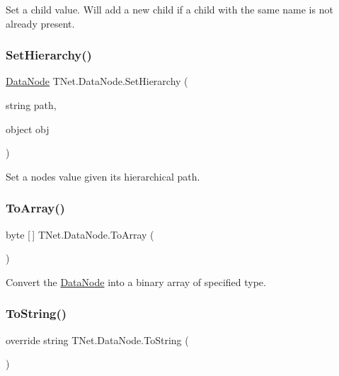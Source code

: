 Set a child value. Will add a new child if a child with the same name is not already present. 

\mbox{\label{class_t_net_1_1_data_node_a2bc2cd72d6ab059e99cb792a5c21ee13}} 
\subsubsection{\texorpdfstring{Set\+Hierarchy()}{SetHierarchy()}}
{\footnotesize\ttfamily \mbox{\hyperlink{class_t_net_1_1_data_node}{Data\+Node}} T\+Net.\+Data\+Node.\+Set\+Hierarchy (\begin{DoxyParamCaption}\item[{string}]{path,  }\item[{object}]{obj }\end{DoxyParamCaption})}



Set a node\textquotesingle{}s value given its hierarchical path. 

\mbox{\label{class_t_net_1_1_data_node_a1c32b63d37a41d31b69aa41c5aa8ba2c}} 
\subsubsection{\texorpdfstring{To\+Array()}{ToArray()}}
{\footnotesize\ttfamily byte \mbox{[}$\,$\mbox{]} T\+Net.\+Data\+Node.\+To\+Array (\begin{DoxyParamCaption}{ }\end{DoxyParamCaption})}



Convert the \mbox{\hyperlink{class_t_net_1_1_data_node}{Data\+Node}} into a binary array of specified type. 

\mbox{\label{class_t_net_1_1_data_node_ad8aa51ff34bafbbc04d1c366f143784a}} 
\subsubsection{\texorpdfstring{To\+String()}{ToString()}}
{\footnotesize\ttfamily override string T\+Net.\+Data\+Node.\+To\+String (\begin{DoxyParamCaption}{ }\end{DoxyParamCaption})}



